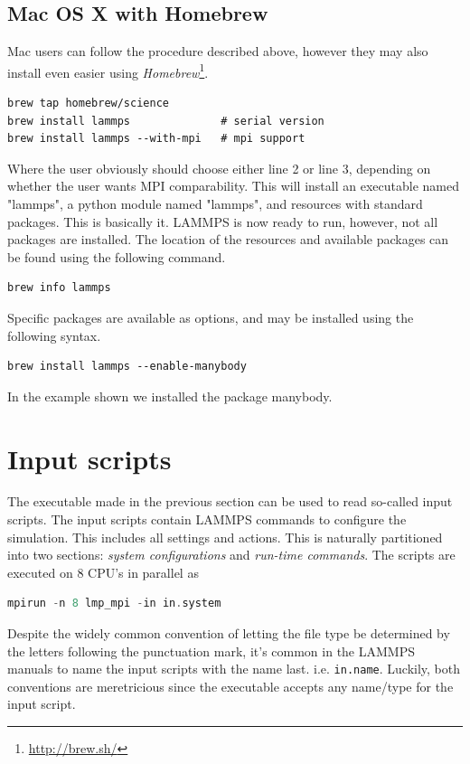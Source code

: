 \documentclass[twoside,english]{uiofysmaster}
\begin{document}
\subsection{Mac OS X with Homebrew}
Mac users can follow the procedure described above, however they may also install even easier using \textit{Homebrew}\footnote{\href{http://brew.sh/}{http://brew.sh/}}. 
\begin{lstlisting}
brew tap homebrew/science
brew install lammps              # serial version
brew install lammps --with-mpi   # mpi support 
\end{lstlisting}
Where the user obviously should choose either line 2 or line 3, depending on whether the user wants MPI comparability.
This will install an executable named "lammps", a python module named "lammps", and resources with standard packages. 
This is basically it. LAMMPS is now ready to run, however, not all packages are installed.
The location of the resources and available packages can be found using the following command.
\begin{lstlisting}
brew info lammps 
\end{lstlisting}
Specific packages are available as options, and may be installed using the following syntax.

\begin{lstlisting}
brew install lammps --enable-manybody 
\end{lstlisting}
In the example shown we installed the package manybody.





\section{Input scripts}
The executable made in the previous section can be used to read so-called input scripts. 
The input scripts contain LAMMPS commands to configure the simulation. This includes all settings and actions. 
This is naturally partitioned into two sections: \textit{system configurations} and \textit{run-time commands}.
The scripts are executed on 8 CPU's in parallel as
\begin{lstlisting}[language=c++]
mpirun -n 8 lmp_mpi -in in.system
\end{lstlisting} 
Despite the widely common convention of letting the file type be determined by the letters following the punctuation mark, it's common in the LAMMPS manuals to name the input scripts with the name last. i.e. \texttt{in.name}. Luckily, both conventions are meretricious since the executable accepts any name/type for the input script.
\end{document}
